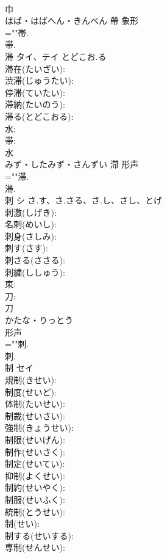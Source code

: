 \documentclass[8pt]{extreport}
\begin{document}
\begin{CJK}{UTF8}{min}
\\	巾	
\\	はば・はばへん・きんべん	帶	象形 
\\	=""帯.
\\	帯.
\\	滞	タイ、テイ	とどこお.る		
\\	滞在(たいざい): 
\\	渋滞(じゅうたい): 
\\	停滞(ていたい): 
\\	滞納(たいのう): 
\\	滞る(とどこおる): 
\\	水: 
\\	帯: 
\\	水	
\\	みず・したみず・さんずい	滯	形声 
\\	=""滞.
\\	滞.
\\	刺	シ	さ.す、さ.さる、さ.し、さし、とげ		
\\	刺激(しげき): 
\\	名刺(めいし): 
\\	刺身(さしみ): 
\\	刺す(さす): 
\\	刺さる(ささる): 
\\	刺繍(ししゅう): 
\\	朿: 
\\	刀: 
\\	刀	
\\	かたな・りっとう	
\\	形声 
\\	=""刺.
\\	刺.
\\	制	セイ			
\\	規制(きせい): 
\\	制度(せいど): 
\\	体制(たいせい): 
\\	制裁(せいさい): 
\\	強制(きょうせい): 
\\	制限(せいげん): 
\\	制作(せいさく): 
\\	制定(せいてい): 
\\	抑制(よくせい): 
\\	制約(せいやく): 
\\	制服(せいふく): 
\\	統制(とうせい): 
\\	制(せい): 
\\	制する(せいする): 
\\	専制(せんせい): 

\end{CJK}
\end{document}
